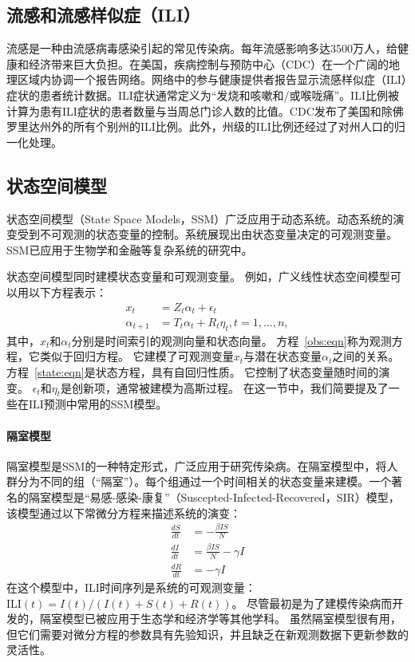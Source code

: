   \subsection{流感和流感样似症（ILI）}
  流感是一种由流感病毒感染引起的常见传染病。每年流感影响多达3500万人，给健康和经济带来巨大负担。在美国，疾病控制与预防中心（CDC）在一个广阔的地理区域内协调一个报告网络。网络中的参与健康提供者报告显示流感样似症（ILI）症状的患者统计数据。ILI症状通常定义为“发烧和咳嗽和/或喉咙痛”。ILI比例被计算为患有ILI症状的患者数量与当周总门诊人数的比值。CDC发布了美国和除佛罗里达州外的所有个别州的ILI比例。此外，州级的ILI比例还经过了对州人口的归一化处理。
  
  \subsection{状态空间模型}
  状态空间模型（State Space Models，SSM）广泛应用于动态系统。动态系统的演变受到不可观测的状态变量的控制。系统展现出由状态变量决定的可观测变量。SSM已应用于生物学和金融等复杂系统的研究中。
  
  状态空间模型同时建模状态变量和可观测变量。
  例如，广义线性状态空间模型可以用以下方程表示：
\begin{align}
x_t &= Z_t\alpha_t + \epsilon_t  \label{obs:eqn} \\
\alpha_{t+1} &= T_t\alpha_t + R_t\eta_t,  t = 1, ..., n, \label{state:eqn}
\end{align}
其中，$x_t$和$\alpha_t$分别是时间索引的观测向量和状态向量。
方程~\ref{obs:eqn}称为观测方程，它类似于回归方程。
它建模了可观测变量$x_t$与潜在状态变量$\alpha_t$之间的关系。
方程~\ref{state:eqn}是状态方程，具有自回归性质。
它控制了状态变量随时间的演变。
$\epsilon_t$和$\eta_t$是创新项，通常被建模为高斯过程。
在这一节中，我们简要提及了一些在ILI预测中常用的SSM模型。

\paragraph*{隔室模型}
隔室模型是SSM的一种特定形式，广泛应用于研究传染病。在隔室模型中，将人群分为不同的组（“隔室”）。每个组通过一个时间相关的状态变量来建模。一个著名的隔室模型是“易感-感染-康复”（Suscepted-Infected-Recovered，SIR）模型，该模型通过以下常微分方程来描述系统的演变：
\begin{align*}
\frac{dS}{dt} &= -\frac{\beta IS}{N}\\
\frac{dI}{dt} &= \frac{\beta IS}{N} - \gamma I\\
\frac{dR}{dt} &= -\gamma I
\end{align*}
在这个模型中，ILI时间序列是系统的可观测变量：$\mathrm{ILI}(t) = I(t) / (I(t) + S(t) + R(t))$。
尽管最初是为了建模传染病而开发的，隔室模型已被应用于生态学和经济学等其他学科。
虽然隔室模型很有用，但它们需要对微分方程的参数具有先验知识，并且缺乏在新观测数据下更新参数的灵活性。
